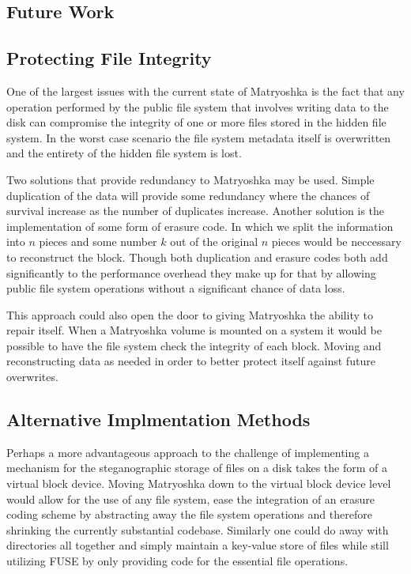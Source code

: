 \documentclass{article}
\begin{document}
\begin{multicols}{2}
\section{Future Work}

\subsection{Protecting File Integrity}
One of the largest issues with the current state of Matryoshka is the fact that any operation performed by the public file system that involves writing data to the disk can compromise the integrity of one or more files stored in the hidden file system. In the worst case scenario the file system metadata itself is overwritten and the entirety of the hidden file system is lost.

Two solutions that provide redundancy to Matryoshka may be used. Simple duplication of the data will provide some redundancy where the chances of survival increase as the number of duplicates increase. Another solution is the implementation of some form of erasure code. In which we split the information into $n$ pieces and some number $k$ out of the original $n$ pieces would be neccessary to reconstruct the block. Though both duplication and erasure codes both add significantly to the performance overhead they make up for that by allowing public file system operations without a significant chance of data loss. 

This approach could also open the door to giving Matryoshka the ability to repair itself. When a Matryoshka volume is mounted on a system it would be possible to have the file system check the integrity of each block. Moving and reconstructing data as needed in order to better protect itself against future overwrites. 

\subsection{Alternative Implmentation Methods}
Perhaps a more advantageous approach to the challenge of implementing a mechanism for the steganographic storage of files on a disk takes the form of a virtual block device. Moving Matryoshka down to the virtual block device level would allow for the use of any file system, ease the integration of an erasure coding scheme by abstracting away the file system operations and therefore shrinking the currently substantial codebase. Similarly one could do away with directories all together and simply maintain a key-value store of files while still utilizing FUSE by only providing code for the essential file operations.


\end{multicols}
\end{document}
